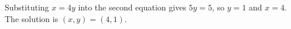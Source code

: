 Substituting $x=4y$ into the second equation gives $5y=5$, so $y=1$ and $x=4$. The solution is $\boxed{(x,y)=(4,1)}$.
